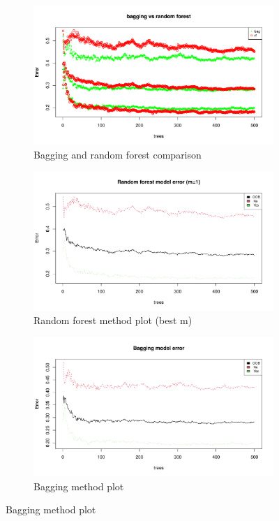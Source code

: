 \begin{figure}[H]
	\centering
	\begin{subfigure}{.3\textwidth}
		\centering
		\includegraphics[width=\linewidth]{ImageFiles/Classification/Trees/vs_bagg_for_500_plot}
		\caption{Bagging and random forest comparison}
		\label{fig:vs_bagg_for_500_plot}
	\end{subfigure}%
	\hfill
	\begin{subfigure}{.3\textwidth}
		\centering
		\includegraphics[width=\linewidth]{ImageFiles/Classification/Trees/best_for_500_plot}
		\caption{Random forest method plot (best m)}
		\label{fig:best_for_500_plot}
	\end{subfigure}%
	\hfill
	\begin{subfigure}{.3\textwidth}
		\centering
		\includegraphics[width=\linewidth]{ImageFiles/Classification/Trees/bagg_500_plot}
		\caption{Bagging method plot}
		\label{fig:bagg_500_plot}
	\end{subfigure}
\end{figure}

